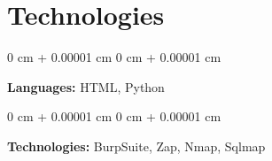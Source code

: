 \documentclass[10pt, letterpaper]{article}
\newenvironment{onecolentry}{
    \begin{adjustwidth}{
        0 cm + 0.00001 cm
    }{
        0 cm + 0.00001 cm
    }
}{
    \end{adjustwidth}
} %
\begin{document}
   
   
   
 \section{Technologies}


 \vspace{0.35 cm}
        
        \begin{onecolentry}
            \textbf{Languages:} HTML, Python
        \end{onecolentry}

        \vspace{0.2 cm}

        \begin{onecolentry}
            \textbf{Technologies:} BurpSuite, Zap, Nmap, Sqlmap
        \end{onecolentry}


    
\end{document}
